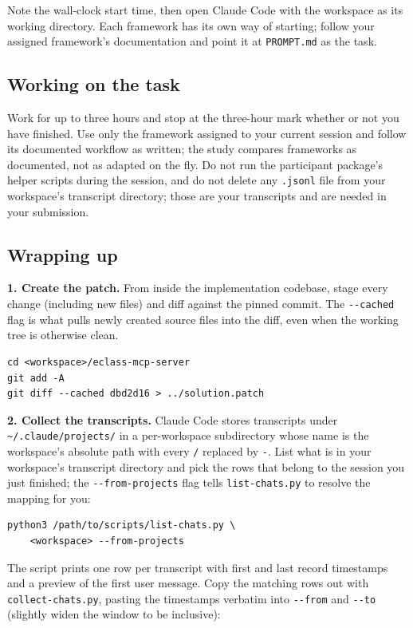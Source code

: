 \documentclass[11pt, a4paper]{article}
\begin{document}
Note the wall-clock start time, then open Claude Code with the workspace as its working directory. Each framework has its own way of starting; follow your assigned framework's documentation and point it at \texttt{PROMPT.md} as the task.

\subsection{Working on the task}
\label{sec:working}

Work for up to three hours and stop at the three-hour mark whether or not you have finished. Use only the framework assigned to your current session and follow its documented workflow as written; the study compares frameworks as documented, not as adapted on the fly. Do not run the participant package's helper scripts during the session, and do not delete any \texttt{.jsonl} file from your workspace's transcript directory; those are your transcripts and are needed in your submission.

\subsection{Wrapping up}
\label{sec:wrapping}

\textbf{1. Create the patch.} From inside the implementation codebase, stage every change (including new files) and diff against the pinned commit. The \texttt{-{}-cached} flag is what pulls newly created source files into the diff, even when the working tree is otherwise clean.

\begin{verbatim}
cd <workspace>/eclass-mcp-server
git add -A
git diff --cached dbd2d16 > ../solution.patch
\end{verbatim}

\textbf{2. Collect the transcripts.} Claude Code stores transcripts under \texttt{\textasciitilde/.claude/projects/} in a per-workspace subdirectory whose name is the workspace's absolute path with every \texttt{/} replaced by \texttt{-}. List what is in your workspace's transcript directory and pick the rows that belong to the session you just finished; the \texttt{-{}-from-projects} flag tells \texttt{list-chats.py} to resolve the mapping for you:

\begin{verbatim}
python3 /path/to/scripts/list-chats.py \
    <workspace> --from-projects
\end{verbatim}

The script prints one row per transcript with first and last record timestamps and a preview of the first user message. Copy the matching rows out with \texttt{collect-chats.py}, pasting the timestamps verbatim into \texttt{-{}-from} and \texttt{-{}-to} (slightly widen the window to be inclusive):
\end{document}
